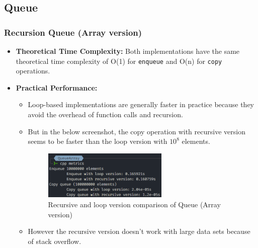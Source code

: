 \thispagestyle{empty}
\subsection{Queue}
\subsubsection*{Recursion Queue (Array version)}
\begin{itemize}
	\item \textbf{Theoretical Time Complexity:} Both implementations have the same theoretical time complexity of O(1) for \verb|enqueue| and O(n) for \verb|copy| operations.
	\item \textbf{Practical Performance:}
	      \begin{itemize}
		      \item  Loop-based implementations are generally faster in practice because they avoid the overhead of function calls and recursion.
		      \item But in the below screenshot, the copy operation with recursive version seems to be faster than the loop version with \(10^{8}\) elements.
		            \begin{figure}[!ht]
			            \centering
			            \includegraphics[width=0.6\textwidth]{imgs/QueueArray/metrics.png}
			            \caption{Recursive and loop version comparison of Queue (Array version)}\label{fig:queue_arr_metrics}
		            \end{figure}
		      \item However the recursive version doesn't work with large data sets because of stack overflow.
	      \end{itemize}
\end{itemize}

